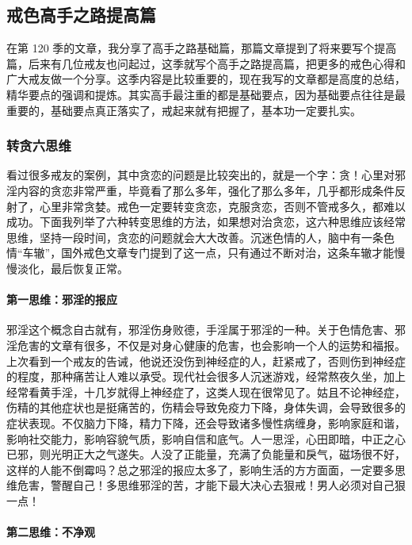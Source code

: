 \subsection{戒色高手之路提高篇}

在第 120 季的文章，我分享了高手之路基础篇，那篇文章提到了将来要写个提高篇，后来有几位戒友也问起过，这季就写个高手之路提高篇，把更多的戒色心得和广大戒友做一个分享。这季内容是比较重要的，现在我写的文章都是高度的总结，精华要点的强调和提炼。其实高手最注重的都是基础要点，因为基础要点往往是最重要的，基础要点真正落实了，戒起来就有把握了，基本功一定要扎实。

\subsubsection{转贪六思维}

看过很多戒友的案例，其中贪恋的问题是比较突出的，就是一个字：贪！心里对邪淫内容的贪恋非常严重，毕竟看了那么多年，强化了那么多年，几乎都形成条件反射了，心里非常贪婪。戒色一定要转变贪恋，克服贪恋，否则不管戒多久，都难以成功。下面我列举了六种转变思维的方法，如果想对治贪恋，这六种思维应该经常思维，坚持一段时间，贪恋的问题就会大大改善。沉迷色情的人，脑中有一条色情“车辙”，国外戒色文章专门提到了这一点，只有通过不断对治，这条车辙才能慢慢淡化，最后恢复正常。

\paragraph{第一思维：邪淫的报应}

邪淫这个概念自古就有，邪淫伤身败德，手淫属于邪淫的一种。关于色情危害、邪淫危害的文章有很多，不仅是对身心健康的危害，也会影响一个人的运势和福报。上次看到一个戒友的告诫，他说还没伤到神经症的人，赶紧戒了，否则伤到神经症的程度，那种痛苦让人难以承受。现代社会很多人沉迷游戏，经常熬夜久坐，加上经常看黄手淫，十几岁就得上神经症了，这类人现在很常见了。姑且不论神经症，伤精的其他症状也是挺痛苦的，伤精会导致免疫力下降，身体失调，会导致很多的症状表现。不仅脑力下降，精力下降，还会导致诸多慢性病缠身，影响家庭和谐，影响社交能力，影响容貌气质，影响自信和底气。人一思淫，心田即暗，中正之心已邪，则光明正大之气遂失。人没了正能量，充满了负能量和戾气，磁场很不好，这样的人能不倒霉吗？总之邪淫的报应太多了，影响生活的方方面面，一定要多思维危害，警醒自己！多思维邪淫的苦，才能下最大决心去狠戒！男人必须对自己狠一点！

\paragraph{第二思维：不净观}

